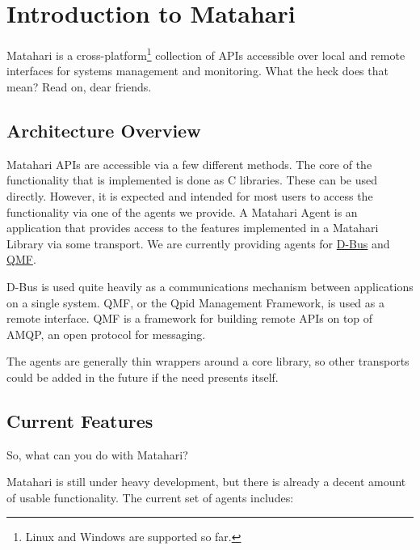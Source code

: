 \section{Introduction to Matahari}

Matahari is a cross-platform\footnote{Linux and Windows are supported so far.} collection of APIs accessible over local and remote interfaces for systems management and monitoring. What the heck does that mean? Read on, dear friends.

\subsection{Architecture Overview}

Matahari APIs are accessible via a few different methods. The core of the functionality that is implemented is done as C libraries. These can be used directly. However, it is expected and intended for most users to access the functionality via one of the agents we provide. A Matahari Agent is an application that provides access to the features implemented in a Matahari Library via some transport. We are currently providing agents for \href{http://www.freedesktop.org/wiki/Software/dbus}{D-Bus} and \href{http://qpid.apache.org/}{QMF}.

D-Bus is used quite heavily as a communications mechanism between applications on a single system. QMF, or the Qpid Management Framework, is used as a remote interface. QMF is a framework for building remote APIs on top of AMQP, an open protocol for messaging.

The agents are generally thin wrappers around a core library, so other transports could be added in the future if the need presents itself. 

\subsection{Current Features}

So, what can you do with Matahari?

Matahari is still under heavy development, but there is already a decent amount of usable functionality. The current set of agents includes:

